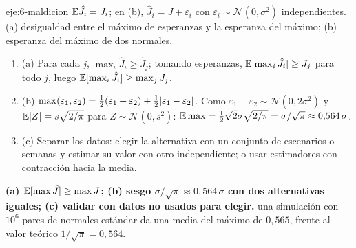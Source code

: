 \begin{solucion}{eje:6-maldicion}
\datos $\mathbb{E}\hat J_i=J_i$; en (b), $\hat J_i=J+\varepsilon_i$ con $\varepsilon_i\sim\mathcal N(0,\sigma^{2})$ independientes.
\planteamiento (a) desigualdad entre el máximo de esperanzas y la esperanza del máximo; (b) esperanza del máximo de dos normales.
\pasos
\begin{enumerate}[label=\arabic*.]
  \item (a) Para cada $j$, $\max_i\hat J_i\ge\hat J_j$; tomando esperanzas, $\mathbb{E}[\max_i\hat J_i]\ge J_j$ para todo $j$, luego $\mathbb{E}[\max_i\hat J_i]\ge\max_jJ_j$.
  \item (b) $\max(\varepsilon_1,\varepsilon_2)=\tfrac12(\varepsilon_1+\varepsilon_2)+\tfrac12\lvert\varepsilon_1-\varepsilon_2\rvert$. Como $\varepsilon_1-\varepsilon_2\sim\mathcal N(0,2\sigma^{2})$ y $\mathbb{E}\lvert Z\rvert=s\sqrt{2/\pi}$ para $Z\sim\mathcal N(0,s^{2})$: $\mathbb{E}\max=\tfrac12\sqrt{2}\sigma\sqrt{2/\pi}=\sigma/\sqrt{\pi}\approx 0{,}564\,\sigma$.
  \item (c) Separar los datos: elegir la alternativa con un conjunto de escenarios o semanas y estimar su valor con otro independiente; o usar estimadores con contracción hacia la media.
\end{enumerate}
\resultado \textbf{(a) $\mathbb{E}[\max\hat J]\ge\max J$; (b) sesgo $\sigma/\sqrt{\pi}\approx 0{,}564\,\sigma$ con dos alternativas iguales; (c) validar con datos no usados para elegir.}
\comprobacion una simulación con $10^{6}$ pares de normales estándar da una media del máximo de $0{,}565$, frente al valor teórico $1/\sqrt{\pi}=0{,}564$.
\end{solucion}
